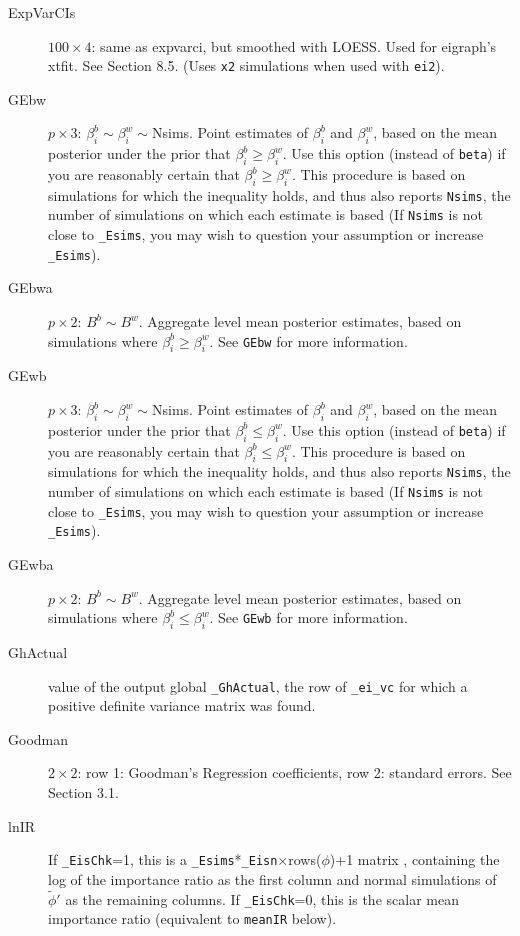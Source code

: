 \documentclass[11pt,titlepage]{article}
\begin{document}
\begin{description}
\item[ExpVarCIs] $100\times 4$: same as expvarci, but smoothed with
  LOESS.  Used for eigraph's xtfit.  See Section 8.5.  (Uses
  \texttt{x2} simulations when used with \texttt{ei2}).

\item[GEbw] $p\times 3$: $\beta_i^b\sim\beta_i^w\sim$Nsims.  Point
  estimates of $\beta_i^b$ and $\beta_i^w$, based on the mean
  posterior under the prior that $\beta_i^b\geq\beta_i^w$.  Use this
  option (instead of \texttt{beta}) if you are reasonably certain that
  $\beta_i^b\geq\beta_i^w$.  This procedure is based on simulations for
  which the inequality holds, and thus also reports \texttt{Nsims},
  the number of simulations on which each estimate is based (If
  \texttt{Nsims} is not close to \texttt{\_Esims}, you may wish to
  question your assumption or increase \texttt{\_Esims}).

\item[GEbwa] $p\times 2$: $B^b\sim B^w$.  Aggregate level mean
  posterior estimates, based on simulations where
  $\beta_i^b\geq\beta_i^w$.  See \texttt{GEbw} for more information.

\item[GEwb] $p\times 3$: $\beta_i^b\sim\beta_i^w\sim$Nsims.  Point
  estimates of $\beta_i^b$ and $\beta_i^w$, based on the mean
  posterior under the prior that $\beta_i^b\leq\beta_i^w$.  Use this
  option (instead of \texttt{beta}) if you are reasonably certain that
  $\beta_i^b\leq\beta_i^w$.  This procedure is based on simulations for
  which the inequality holds, and thus also reports \texttt{Nsims},
  the number of simulations on which each estimate is based (If
  \texttt{Nsims} is not close to \texttt{\_Esims}, you may wish to
  question your assumption or increase \texttt{\_Esims}).

\item[GEwba] $p\times 2$: $B^b\sim B^w$.  Aggregate level mean
  posterior estimates, based on simulations where
  $\beta_i^b\leq\beta_i^w$.  See \texttt{GEwb} for more information.

\item[GhActual] value of the output global \texttt{\_GhActual}, the
  row of \texttt{\_ei\_vc} for which a positive definite variance
  matrix was found.

\item[Goodman] $2\times 2$: row 1: Goodman's Regression coefficients,
  row 2: standard errors.  See Section 3.1.

\item[lnIR] If \texttt{\_EisChk}=1, this is a
  \texttt{\_Esims}*\texttt{\_Eisn}$\times$rows($\phi$)+1 matrix ,
  containing the log of the importance ratio as the first column and
  normal simulations of $\tilde{\phi}'$ as the remaining columns.  If
  \texttt{\_EisChk}=0, this is the scalar mean importance ratio
  (equivalent to \texttt{meanIR} below).


\end{description}
\end{document}
